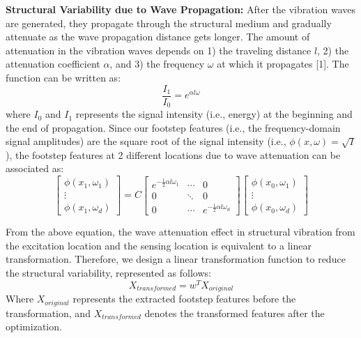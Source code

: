 \documentclass[11pt,letter]{article}
\begin{document}
\begin{multicols*}{2}
\textbf{Structural Variability due to Wave Propagation:}
After the vibration waves are generated, they propagate through the structural medium and gradually attenuate as the wave propagation distance gets longer. The amount of attenuation in the vibration waves depends on 1) the traveling distance $l$, 2) the attenuation coefficient $\alpha$, and 3) the frequency $\omega$ at which it propagates [1]. The function can be written as:
 \begin{equation}
 \frac{I_1}{I_0} = e^{\alpha l \omega}
 \end{equation}
 where $I_0$ and $I_1$ represents the signal intensity (i.e., energy) at the beginning and the end of propagation. Since our footstep features (i.e., the frequency-domain signal amplitudes) are the square root of the signal intensity (i.e., $\phi(x, \omega) = \sqrt{I}$), the footstep features at 2 different locations due to wave attenuation can be associated as:
 \begin{equation}
         \begin{bmatrix}
    \phi(x_1, \omega_1)\\
    \vdots\\
    \phi(x_1, \omega_d)
    \end{bmatrix}
    = C
    \begin{bmatrix}
    e^{-\frac{1}{2}\alpha l \omega_1} & \cdots & 0\\
    0 & \ddots & 0\\
    0 & \cdots & e^{-\frac{1}{2}\alpha l \omega_d}
    \end{bmatrix}
    \begin{bmatrix}
    \phi(x_0, \omega_1)\\
    \vdots\\
    \phi(x_0, \omega_d)
    \end{bmatrix}
 \end{equation}
 
From the above equation, the wave attenuation effect in structural vibration from the excitation location and the sensing location is equivalent to a linear transformation. Therefore, we design a linear transformation function to reduce the structural variability, represented as follows:
\begin{equation}
{X}_{transformed} = {w}^{T}{X}_{original}   \end{equation}
Where $X_{original}$ represents the extracted footstep features before the transformation, and $X_{transformed}$ denotes the transformed features after the optimization.


\end{multicols*}
\end{document}
